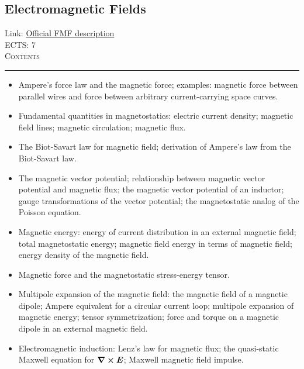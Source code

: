 \documentclass[11pt, a4paper]{article}
\newenvironment{course}[3]{
\subsection{#1}%
Link: \href{#2}{Official FMF description}\\%
ECTS: #3%
\vspace{1ex}
\\
{\large \textsc{Contents}}\\[-0.9ex]%
\rule{\textwidth}{0.5pt}
\vspace{-3ex}
}
{}
\newenvironment{chapter}[1]{
\begin{tcolorbox}[title=#1, breakable]
}
{\end{tcolorbox}}
\begin{document}
\begin{course}{Electromagnetic Fields}{https://www.fmf.uni-lj.si/en/study-physics/programmes/1fiz/2020/7000777/courses/1133/}{7}
\begin{chapter}{Magnetostatics}
        \begin{itemize}
            
            \item Ampere's force law and the magnetic force; examples: magnetic force between parallel wires and force between arbitrary current-carrying space curves.

            \item Fundamental quantities in magnetostatics: electric current density; magnetic field lines; magnetic circulation; magnetic flux.

            \item The Biot-Savart law for magnetic field; derivation of Ampere's law from the Biot-Savart law.

            \item The magnetic vector potential; relationship between magnetic vector potential and magnetic flux; the magnetic vector potential of an inductor; gauge transformations of the vector potential; the magnetostatic analog of the Poisson equation.

            \item Magnetic energy: energy of current distribution in an external magnetic field; total magnetostatic energy; magnetic field energy in terms of magnetic field; energy density of the magnetic field.

            \item Magnetic force and the magnetostatic stress-energy tensor.

            \item Multipole expansion of the magnetic field: the magnetic field of a magnetic dipole; Ampere equivalent for a circular current loop; multipole expansion of magnetic energy; tensor symmetrization; force and torque on a magnetic dipole in an external magnetic field.

            
        \end{itemize}
    \end{chapter}

    \begin{chapter}{Quasi-static electromagnetic fields}

        \begin{itemize}
        
            \item Electromagnetic induction: Lenz's law for magnetic flux; the quasi-static Maxwell equation for $ \curl \bm{E} $; Maxwell magnetic field impulse.


\end{itemize}
\end{chapter}
\end{course}
\end{document}
